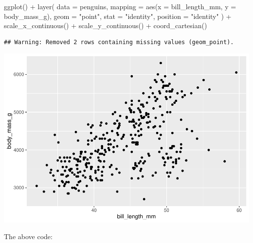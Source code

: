 \documentclass[
]{article}
\newenvironment{Shaded}{\begin{snugshade}}{\end{snugshade}}
\newcommand{\AttributeTok}[1]{\textcolor[rgb]{0.77,0.63,0.00}{#1}}
\newcommand{\FunctionTok}[1]{\textcolor[rgb]{0.00,0.00,0.00}{#1}}
\newcommand{\NormalTok}[1]{#1}
\newcommand{\SpecialCharTok}[1]{\textcolor[rgb]{0.00,0.00,0.00}{#1}}
\newcommand{\StringTok}[1]{\textcolor[rgb]{0.31,0.60,0.02}{#1}}
\begin{document}
\begin{Shaded}
\begin{Highlighting}[]
\FunctionTok{ggplot}\NormalTok{() }\SpecialCharTok{+}
  \FunctionTok{layer}\NormalTok{(}
    \AttributeTok{data =}\NormalTok{ penguins, }\AttributeTok{mapping =} \FunctionTok{aes}\NormalTok{(}\AttributeTok{x =}\NormalTok{ bill\_length\_mm, }\AttributeTok{y =}\NormalTok{ body\_mass\_g),}
    \AttributeTok{geom =} \StringTok{"point"}\NormalTok{, }\AttributeTok{stat =} \StringTok{"identity"}\NormalTok{, }\AttributeTok{position =} \StringTok{"identity"}
\NormalTok{  ) }\SpecialCharTok{+}
  \FunctionTok{scale\_x\_continuous}\NormalTok{() }\SpecialCharTok{+}
  \FunctionTok{scale\_y\_continuous}\NormalTok{() }\SpecialCharTok{+}
  \FunctionTok{coord\_cartesian}\NormalTok{()}
\end{Highlighting}
\end{Shaded}

\begin{verbatim}
## Warning: Removed 2 rows containing missing values (geom_point).
\end{verbatim}

\includegraphics{Grammar-of-Graphics_files/figure-latex/default-1.pdf}

The above code:
\end{document}
